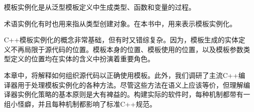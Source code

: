 模板实例化是从泛型模板定义中生成类型、函数和变量的过程。

\begin{tcolorbox}[colback=webgreen!5!white,colframe=webgreen!75!black]
\hspace*{0.75cm}术语实例化有时也用来指从类型创建对象。在本书中，用来表示模板实例化。
\end{tcolorbox}

C++模板实例化的概念非常基础，但有时又错综复杂。因为，模板生成的实体定义不再局限于源代码的位置。模板本身的位置、模板使用的位置，以及模板参数类型定义的位置均在实体的含义中扮演着重要角色。

本章中，将解释如何组织源代码以正确使用模板。此外，我们调研了主流C++编译器用于处理模板实例化的各种方法。尽管这些方法在语义上应该等价，但理解编译器实例化策略的基本原则是大有裨益的。构建实际的软件时，每种机制都带有一组小怪癖，并且每种机制都影响了标准C++规范。